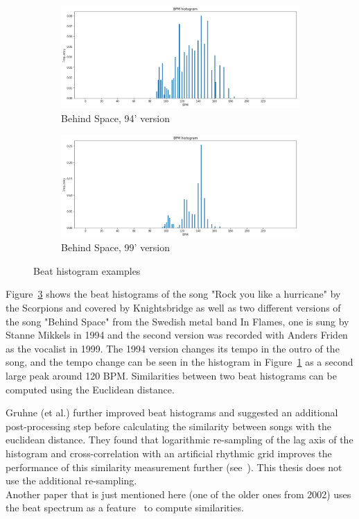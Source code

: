 \begin{figure}[htbp]
{{			\begin{subfigure}{.495\textwidth}
				\centering
				\includegraphics[scale=0.25]{Images/Beat/s_s_bh.png}
				\caption{Behind Space, 94' version}
				\label{ssbh}
			\end{subfigure}%
			\begin{subfigure}{.495\textwidth}
				\centering
				\includegraphics[scale=0.25]{Images/Beat/s_a_bh.png}
				\caption{Behind Space, 99' version}
				\label{sabh}
			\end{subfigure}%
	}}
	\caption{Beat histogram examples}
	\label{fig:bh1}
\end{figure}
\FloatBarrier

\noindent Figure~\ref{fig:bh1} shows the beat histograms of the song "Rock you like a hurricane" by the Scorpions and covered by Knightsbridge as well as two different versions of the song "Behind Space" from the Swedish metal band In Flames, one is sung by Stanne Mikkels in 1994 and the second version was recorded with Anders Friden as the vocalist in 1999. The 1994 version changes its tempo in the outro of the song, and the tempo change can be seen in the histogram in Figure~\ref{ssbh} as a second large peak around 120 BPM.
Similarities between two beat histograms can be computed using the Euclidean distance. 


\noindent Gruhne (et al.) further improved beat histograms and suggested an additional post-processing step before calculating the similarity between songs with the euclidean distance. They found that logarithmic re-sampling of the lag axis of the histogram and cross-correlation with an artificial rhythmic grid improves the performance of this similarity measurement further (see~\cite[182]{rbh1}). This thesis does not use the additional re-sampling.\\
\noindent Another paper that is just mentioned here (one of the older ones from 2002) uses the beat spectrum as a feature~\cite{rhythm1} to compute similarities.

